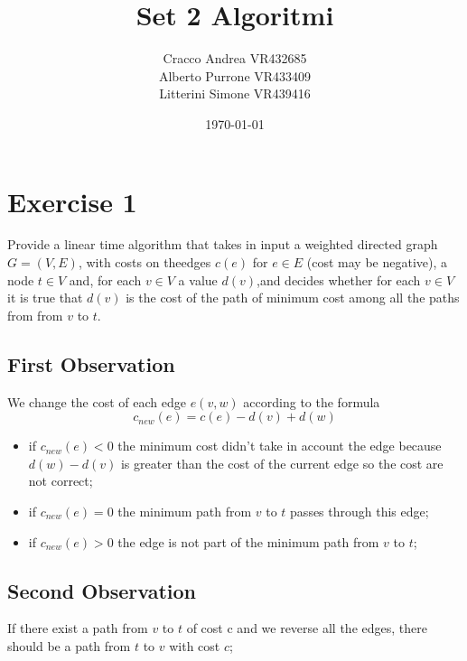 \documentclass[]{article}
\begin{document}
\title{Set 2 Algoritmi}
\author{Cracco Andrea VR432685\\Alberto Purrone VR433409\\Litterini Simone VR439416\\}
\date{\today}
\maketitle




\section{Exercise 1}

Provide a linear time algorithm that takes in input a weighted directed graph $G = (V, E)$,
with costs on theedges $c(e)$ for $e∈E$ (cost may be negative), a node $t∈V$ and,
for each $v∈V$ a value $d(v)$,and decides whether for each $v ∈ V$ it is true that $d(v)$ is the
cost of the path of minimum cost among all the paths from from $v$ to $t$.

\subsection{First Observation}

We change the cost of each edge $e(v,w)$ according to the formula $$ c_{new}(e) = c(e)-d(v)+d(w)$$

\begin{itemize}

\item if $c_{new}(e)  < 0$ the minimum cost didn't take in account the edge because $d(w) - d(v)$ is greater
than the cost of the current edge so the cost are not correct;

\item if $c_{new}(e)  = 0$ the minimum path from $v$ to $t$ passes through this edge;

\item if $c_{new}(e)  > 0$ the edge is not part of the minimum path from $v$ to $t$;


\end{itemize}

\subsection{Second Observation}

If there exist a path from $v$ to $t$ of cost c and we reverse all the edges, there should be a path from $t$ to $v$ with cost $c$;
\end{document}
